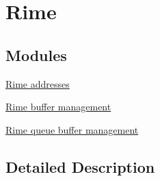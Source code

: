 \hypertarget{group__rime}{}\section{Rime}
\label{group__rime}
\subsection*{Modules}
\begin{DoxyCompactItemize}
\item 
\hyperlink{group__linkaddr}{Rime addresses}
\item 
\hyperlink{group__packetbuf}{Rime buffer management}
\item 
\hyperlink{group__rimequeuebuf}{Rime queue buffer management}
\end{DoxyCompactItemize}


\subsection{Detailed Description}
